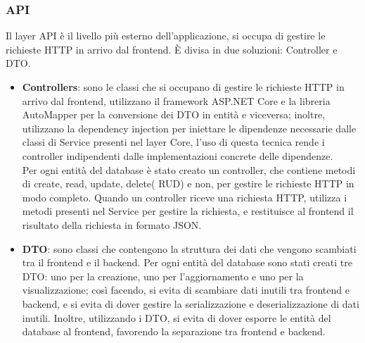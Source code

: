 \subsubsection{API}
Il layer API è il livello più esterno dell'applicazione, si occupa di gestire le richieste HTTP in arrivo dal frontend. È divisa in due soluzioni: Controller e DTO.\\
\begin{itemize}
    \item \textbf{Controllers}: sono le classi che si occupano di gestire le richieste HTTP in arrivo dal frontend, utilizzano il framework ASP.NET Core e la libreria AutoMapper per la conversione dei DTO in entità e viceversa; inoltre, utilizzano la dependency injection per iniettare le dipendenze necessarie dalle classi di Service presenti nel layer Core, l'uso di questa tecnica rende i controller indipendenti dalle implementazioni concrete delle dipendenze.\\
    Per ogni entità del database è stato creato un controller, che contiene metodi di  create, read, update, delete( RUD) e non, per gestire le richieste HTTP in modo completo. Quando un controller riceve una richiesta HTTP, utilizza i metodi presenti nel Service per gestire la richiesta, e restituisce al frontend il risultato della richiesta in formato JSON.\\
    \item \textbf{DTO}: sono classi che contengono la struttura dei dati che vengono scambiati tra il frontend e il backend.
    Per ogni entità del database sono stati creati tre DTO: uno per la creazione, uno per l'aggiornamento e uno per la visualizzazione; così facendo, si evita di scambiare dati inutili tra frontend e backend, e si evita di dover gestire la serializzazione e deserializzazione di dati inutili. Inoltre, utilizzando i DTO, si evita di dover esporre le entità del database al frontend, favorendo la separazione tra frontend e backend.\\
\end{itemize}
